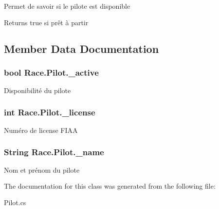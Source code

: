 Permet de savoir si le pilote est disponible 

\begin{DoxyReturn}{Returns}
true si prêt à partir
\end{DoxyReturn}


\subsection{Member Data Documentation}
\hypertarget{class_race_1_1_pilot_acb1cd4a31a0d46668c8b579ae0b21c26}{}
\subsubsection[{\+\_\+active}]{\setlength{\rightskip}{0pt plus 5cm}bool Race.\+Pilot.\+\_\+active}\label{class_race_1_1_pilot_acb1cd4a31a0d46668c8b579ae0b21c26}


Disponibilité du pilote 

\hypertarget{class_race_1_1_pilot_a4587e5f43f5ea68ad850831dfbdf7f5d}{}
\subsubsection[{\+\_\+license}]{\setlength{\rightskip}{0pt plus 5cm}int Race.\+Pilot.\+\_\+license}\label{class_race_1_1_pilot_a4587e5f43f5ea68ad850831dfbdf7f5d}


Numéro de license F\+I\+A\+A 

\hypertarget{class_race_1_1_pilot_a10981c1bc4f92cb9b1610f3059abb50b}{}
\subsubsection[{\+\_\+name}]{\setlength{\rightskip}{0pt plus 5cm}String Race.\+Pilot.\+\_\+name}\label{class_race_1_1_pilot_a10981c1bc4f92cb9b1610f3059abb50b}


Nom et prénom du pilote 



The documentation for this class was generated from the following file\+:\begin{DoxyCompactItemize}
\item 
Pilot.\+cs\end{DoxyCompactItemize}
